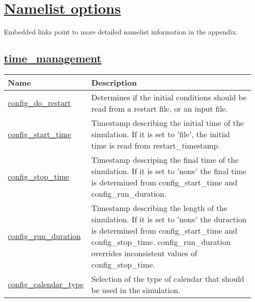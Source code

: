 \chapter[Namelist options]{\hyperref[chap:namelist_sections]{Namelist options}}
\label{chap:namelist_tables}
Embedded links point to more detailed namelist information in the appendix.
\section[time\_management]{\hyperref[sec:nm_sec_time_management]{time\_management}}
\label{sec:nm_tab_time_management}

{\small
\begin{center}
\begin{longtable}{| p{2.0in} || p{4.0in} |}
	\hline
	{\bf Name} & {\bf Description} \\
	\hline
	\hline
	\hyperref[subsec:nm_sec_config_do_restart]{config\_do\_restart} & Determines if the initial conditions should be read from a restart file, or an input file. \\
	\hline
	\hyperref[subsec:nm_sec_config_start_time]{config\_start\_time} & Timestamp describing the initial time of the simulation. If it is set to 'file', the initial time is read from restart\_timestamp. \\
	\hline
	\hyperref[subsec:nm_sec_config_stop_time]{config\_stop\_time} & Timestamp descriping the final time of the simulation. If it is set to 'none' the final time is determined from config\_start\_time and config\_run\_duration. \\
	\hline
	\hyperref[subsec:nm_sec_config_run_duration]{config\_run\_duration} & Timestamp describing the length of the simulation. If it is set to 'none' the duraction is determined from config\_start\_time and config\_stop\_time. config\_run\_duration overrides inconsistent values of config\_stop\_time. \\
	\hline
	\hyperref[subsec:nm_sec_config_calendar_type]{config\_calendar\_type} & Selection of the type of calendar that should be used in the simulation. \\
	\hline
\end{longtable}
\end{center}
}
